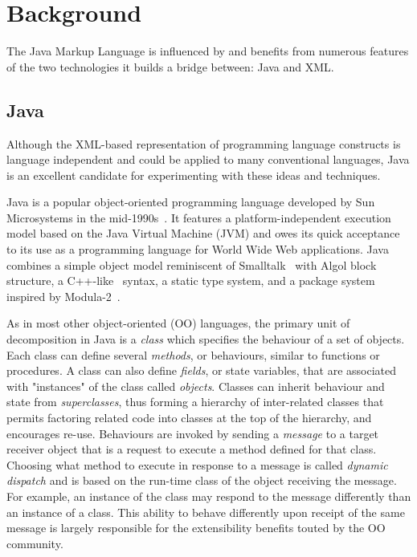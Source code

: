 \documentclass{article}
\begin{document}
\section{Background}
\label{sec-background}

The Java Markup Language is influenced by and benefits from numerous
features of the two technologies it builds a bridge between: Java and
XML.

\subsection{Java}
\label{ssec-java}

Although the XML-based representation of programming language constructs
is language independent and could be applied to many conventional
languages, Java is an excellent candidate for experimenting with these
ideas and techniques.

Java is a popular object-oriented programming language developed by Sun
Microsystems in the mid-1990s~\cite{Arnold98,Flanagan97}.  It features a
platform-independent execution model based on the Java Virtual Machine
(JVM) and owes its quick acceptance to its use as a programming language
for World Wide Web applications.  Java combines a simple object model
reminiscent of Smalltalk~\cite{Goldberg89} with Algol block structure, a
C++-like~\cite{Stroustrup97} syntax, a static type system, and a package system
inspired by Modula-2~\cite{Modula2}.

As in most other object-oriented (OO) languages, the primary unit of
decomposition in Java is a \emph{class} which specifies the behaviour of
a set of objects.  Each class can define several \emph{methods}, or
behaviours, similar to functions or procedures. A class can also define
\emph{fields}, or state variables, that are associated with "instances"
of the class called \emph{objects}. Classes can inherit behaviour and
state from \emph{superclasses}, thus forming a hierarchy of
inter-related classes that permits factoring related code into classes
at the top of the hierarchy, and encourages re-use.  Behaviours are
invoked by sending a \emph{message} to a target receiver object that is
a request to execute a method defined for that class.  Choosing what
method to execute in response to a message is called \emph{dynamic
  dispatch} and is based on the run-time class of the object receiving
the message.  For example, an instance of the 
class may respond to the  message differently than an
instance of a  class.  This ability to behave differently
upon receipt of the same message is largely responsible for the
extensibility benefits touted by the OO community.
    
\end{document}
